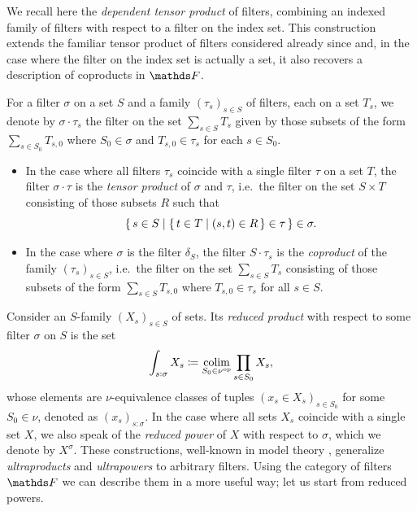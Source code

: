 We recall here the \emph{dependent tensor product} of filters, combining an indexed family of filters with respect to a filter on the index set. This construction extends the familiar tensor product of filters considered already since \cite{blassTwoClosedCategories1977} and, in the case where the filter on the index set is actually a set, it also recovers a description of coproducts in $\FF$. 

\begin{cons}
    For a filter $\sigma$ on a set $S$ and a family $(\tau_s)_{s\in S}$ of filters, each on a set $T_s$, we denote by $\sigma \cdot \tau_s$ the filter on the set $\sum_{s\in S}T_s$ given by those subsets of the form $\sum_{s\in S_0} T_{s,0}$ where $S_0 \in \sigma$ and $T_{s,0} \in \tau_s$ for each $s \in S_0$. 
\begin{itemize}
    \item[(a)]In the case where all filters $\tau_s$ coincide with a single filter $\tau$ on a set $T$, the filter $\sigma\cdot \tau$ is the \emph{tensor product} of $\sigma$ and $\tau$, i.e.\ the filter on the set $S \times T$ consisting of those subsets $R$ such that 
    \[ \set{ s\in S | \set{ t \in T | (s,t) \in R } \in \tau } \in \sigma. \]
    \item[(b)]In the case where $\sigma$ is the filter $\delta_S$, the filter $S\cdot \tau_s$ is the \emph{coproduct} of the family $(\tau_s)_{s\in S}$, i.e.\ the filter on the set $\sum_{s\in S}T_s$ consisting of those subsets of the form $\sum_{s\in S} T_{s,0}$ where $T_{s,0} \in \tau_s$ for all $s \in S$.
\end{itemize}
\end{cons}

Consider an $S$-family $(X_s)_{s\in S}$ of sets. Its \emph{reduced product} with respect to some filter $\sigma$ on $S$ is the set 
\[ \int_{s:\sigma} X_s \coloneqq \operatorname*{colim}_{ S_0 \in \nu^{\mathrm{op}}} \prod_{s\in S_0} X_s,\]
whose elements are $\nu$-equivalence classes of tuples $(x_s \in X_s)_{s\in S_0}$ for some $S_0 \in \nu$, denoted as $(x_s)_{s:\sigma}$. In the case where all sets $X_s$ coincide with a single set $X$, we also speak of the \emph{reduced power} of $X$ with respect to $\sigma$, which we denote by $X^\sigma$. These constructions, well-known in model theory \addref, generalize \emph{ultraproducts} and \emph{ultrapowers} to arbitrary filters. Using the category of filters $\FF$ we can describe them in a more useful way; let us start from reduced powers.

